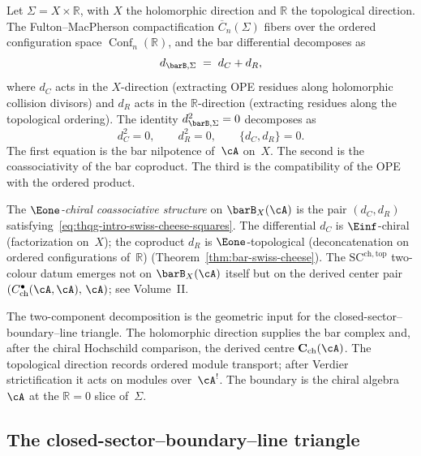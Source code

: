 Let $\Sigma = X \times \mathbb{R}$, with $X$ the holomorphic direction
and $\mathbb{R}$ the topological direction. The Fulton--MacPherson
compactification $\overline{C}_n(\Sigma)$ fibers over the ordered
configuration space $\operatorname{Conf}_n(\mathbb{R})$, and the bar
differential decomposes as
\begin{equation}\label{eq:thqg-intro-swiss-cheese-decomposition}
d_{\barB,\Sigma}
\;=\;
d_C + d_R,
\end{equation}
where $d_C$ acts in the $X$-direction (extracting OPE residues along
holomorphic collision divisors) and $d_R$ acts in the $\mathbb{R}$-direction
(extracting residues along the topological ordering). The identity
$d_{\barB,\Sigma}^2 = 0$ decomposes as
\begin{equation}\label{eq:thqg-intro-swiss-cheese-squares}
d_C^2 = 0, \qquad d_R^2 = 0, \qquad \{d_C, d_R\} = 0.
\end{equation}
The first equation is the bar nilpotence of~$\cA$ on~$X$. The second
is the coassociativity of the bar coproduct. The third is the
compatibility of the OPE with the ordered product.

\begin{definition}
\label{def:thqg-intro-swiss-cheese-structure}
The \emph{$\Eone$-chiral coassociative structure} on $\barB_X(\cA)$ is the
pair $(d_C, d_R)$ satisfying~\eqref{eq:thqg-intro-swiss-cheese-squares}.
The differential $d_C$ is $\Einf$-chiral (factorization on~$X$);
the coproduct $d_R$ is $\Eone$-topological (deconcatenation on
ordered configurations of~$\mathbb{R}$)
(Theorem~\ref{thm:bar-swiss-cheese}).
The $\mathrm{SC}^{\mathrm{ch,top}}$ two-colour datum emerges not on
$\barB_X(\cA)$ itself but on the derived center pair
$(C^\bullet_{\mathrm{ch}}(\cA,\cA),\,\cA)$; see Volume~II\@.
\end{definition}

The two-component decomposition is the geometric input for the
closed-sector--boundary--line triangle. The holomorphic direction supplies the
bar complex and, after the chiral Hochschild comparison, the derived
centre $\mathbf{C}_{\mathrm{ch}}(\cA)$. The topological direction
records ordered module transport; after Verdier strictification it
acts on modules over~$\cA^!$. The boundary is the chiral algebra~$\cA$
at the $\mathbb{R}=0$ slice of~$\Sigma$.

\subsection{The closed-sector--boundary--line triangle}
\label{subsec:thqg-intro-bbl-triangle}

